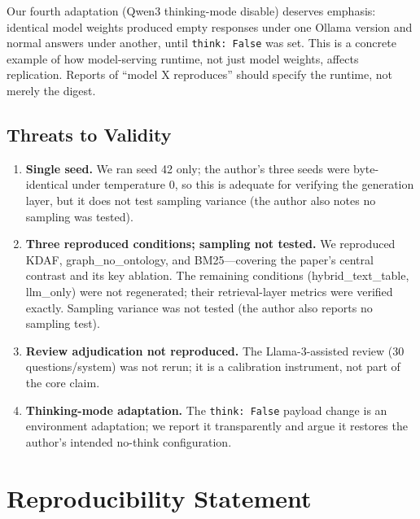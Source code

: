 \documentclass[11pt]{article}
\begin{document}
Our fourth adaptation (Qwen3 thinking-mode disable) deserves emphasis: identical model weights produced empty responses under one Ollama version and normal answers under another, until \texttt{think: False} was set. This is a concrete example of how model-serving runtime, not just model weights, affects replication. Reports of ``model X reproduces'' should specify the runtime, not merely the digest.

\subsection{Threats to Validity}

\begin{enumerate}
\item \textbf{Single seed.} We ran seed 42 only; the author's three seeds were byte-identical under temperature 0, so this is adequate for verifying the generation layer, but it does not test sampling variance (the author also notes no sampling was tested).
\item \textbf{Three reproduced conditions; sampling not tested.} We reproduced KDAF, graph\_no\_ontology, and BM25---covering the paper's central contrast and its key ablation. The remaining conditions (hybrid\_text\_table, llm\_only) were not regenerated; their retrieval-layer metrics were verified exactly. Sampling variance was not tested (the author also reports no sampling test).
\item \textbf{Review adjudication not reproduced.} The Llama-3-assisted review (30 questions/system) was not rerun; it is a calibration instrument, not part of the core claim.
\item \textbf{Thinking-mode adaptation.} The \texttt{think: False} payload change is an environment adaptation; we report it transparently and argue it restores the author's intended no-think configuration.
\end{enumerate}

\section{Reproducibility Statement}
\end{document}

